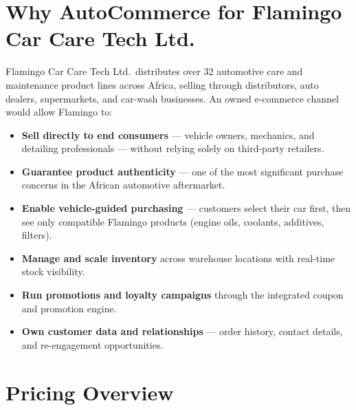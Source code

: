 \documentclass[11pt,a4paper]{article}
\begin{document}
\section{Why AutoCommerce for Flamingo Car Care Tech Ltd.}

Flamingo Car Care Tech Ltd.\ distributes over 32 automotive care and
maintenance product lines across Africa, selling through distributors,
auto dealers, supermarkets, and car-wash businesses. An owned
e-commerce channel would allow Flamingo to:

\begin{itemize}[leftmargin=1.4em,itemsep=3pt]
  \item \textbf{Sell directly to end consumers} --- vehicle owners,
        mechanics, and detailing professionals --- without relying
        solely on third-party retailers.
  \item \textbf{Guarantee product authenticity} --- one of the most
        significant purchase concerns in the African automotive
        aftermarket.
  \item \textbf{Enable vehicle-guided purchasing} --- customers
        select their car first, then see only compatible Flamingo
        products (engine oils, coolants, additives, filters).
  \item \textbf{Manage and scale inventory} across warehouse
        locations with real-time stock visibility.
  \item \textbf{Run promotions and loyalty campaigns} through the
        integrated coupon and promotion engine.
  \item \textbf{Own customer data and relationships} --- order
        history, contact details, and re-engagement opportunities.
\end{itemize}

\section{Pricing Overview}
\end{document}
